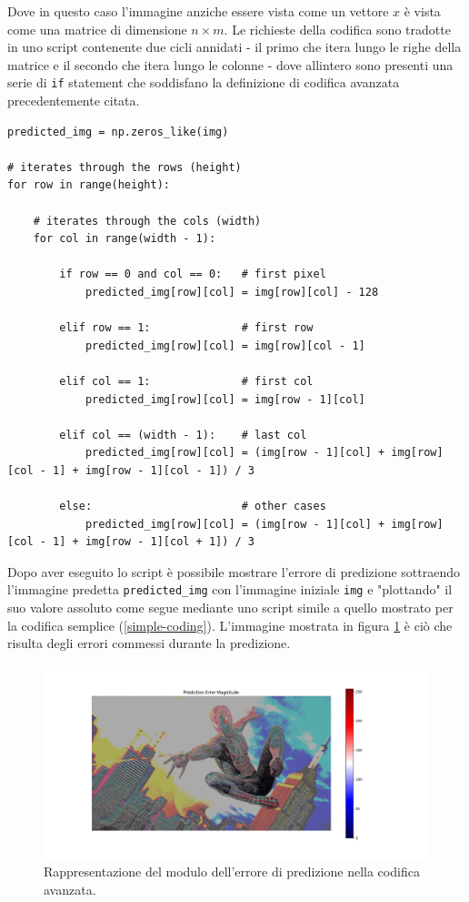 \noindent Dove in questo caso l'immagine anziche essere vista come un vettore $x$ è vista come una matrice di dimensione $n \times m$. Le richieste della codifica sono tradotte in uno script contenente due cicli annidati - il primo che itera lungo le righe della matrice e il secondo che itera lungo le colonne - dove allintero sono presenti una serie di \texttt{if} statement che soddisfano la definizione di codifica avanzata precedentemente citata.


\begin{lstlisting}
predicted_img = np.zeros_like(img)

# iterates through the rows (height)
for row in range(height):

    # iterates through the cols (width)
    for col in range(width - 1):

        if row == 0 and col == 0:   # first pixel
            predicted_img[row][col] = img[row][col] - 128
        
        elif row == 1:              # first row
            predicted_img[row][col] = img[row][col - 1]
        
        elif col == 1:              # first col
            predicted_img[row][col] = img[row - 1][col]
        
        elif col == (width - 1):    # last col
            predicted_img[row][col] = (img[row - 1][col] + img[row][col - 1] + img[row - 1][col - 1]) / 3

        else:                       # other cases
            predicted_img[row][col] = (img[row - 1][col] + img[row][col - 1] + img[row - 1][col + 1]) / 3
\end{lstlisting}

\noindent Dopo aver eseguito lo script è possibile mostrare l'errore di predizione sottraendo l'immagine predetta \texttt{predicted\_img} con l'immagine iniziale \texttt{img} e "plottando" il suo valore assoluto come segue mediante uno script simile a quello mostrato per la codifica semplice (\ref{simple-coding}). L'immagine mostrata in figura \ref{fig:advanced-coding} è ciò che risulta degli errori commessi durante la predizione.

\begin{figure}[h]
    \centering
    \includegraphics[width = .9\textwidth]{hw-1/report/imgs/advanced-coding.png}
    \caption{Rappresentazione del modulo dell'errore di predizione nella codifica avanzata.}
    \label{fig:advanced-coding}
\end{figure}




